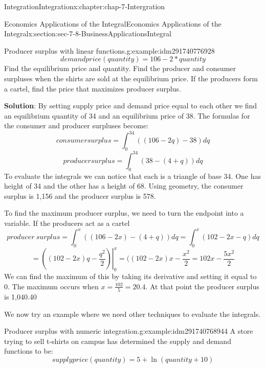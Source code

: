 \documentclass[oneside,10pt,]{book}
\newcommand{\terminology}[1]{\textbf{#1}}
\numberwithin{equation}{section}
\begin{document}
\begin{chapterptx}{Integration}{}{Integration}{}{}{x:chapter:chap-7-Intergration}
\begin{sectionptx}{Economics Applications of the Integral}{}{Economics Applications of the Integral}{}{}{x:section:sec-7-8-BusinessApplicationsIntegral}
\begin{example}{Producer surplus with linear functions.}{g:example:idm291740776928}
\begin{equation*}
\end{equation*}
%
\begin{equation*}
demand price(quantity)=106- 2*quantity
\end{equation*}
Find the equilibrium price and quantity.  Find the producer and consumer surpluses when the shirts are sold at the equilibrium price.  If the producers form a cartel, find the price that maximizes producer surplus.%
\par
\terminology{Solution}: By setting supply price and demand price equal to each other we find an equilibrium quantity of 34 and an equilibrium price of 38.  The formulas for the consumer and producer surpluses become:%
%
\begin{equation*}
consumer surplus= \int_0^{34} ((106-2q)-38)  dq
\end{equation*}
%
\begin{equation*}
producer surplus= \int_0^{34} ( 38-(4+q))  dq
\end{equation*}
To evaluate the integrals we can notice that each is a triangle of base 34.  One has height of 34 and the other has a height of 68.  Using geometry, the consumer surplus is \textdollar{}1,156 and the producer surplus is \textdollar{}578.%
\par
To find the maximum producer surplus, we need to turn the endpoint into a variable.  If the producers act as a cartel%
%
\begin{equation*}
producer\ surplus= \int_0^x ( (106-2x)-(4+q))  dq=\int_0^x ( 102-2x-q)  dq
\end{equation*}
%
\begin{equation*}
=\left.\left((102-2x)q-\frac{q^2}{2}\right) \right|_0^x=((102-2x)x-\frac{x^2}{2}=102x-\frac{5x^2}{2}
\end{equation*}
We can find the maximum of this by taking its derivative and setting it equal to 0.  The maximum occurs when \(x=\frac{102}{5}=20.4\).  At that point the producer surplus is \textdollar{}1,040.40%
\end{example}
We now try an example where we need other techniques to evaluate the integrals.%
\begin{example}{Producer surplus with numeric integration.}{g:example:idm291740768944}%
A store trying to sell t-shirts on campus has determined the supply and demand functions to be:%
%
\begin{equation*}
supply price(quantity)=5+\ln (quantity+10)
\end{equation*}
%
\begin{equation*}

\end{equation*}
\end{example}
\end{sectionptx}
\end{chapterptx}
\end{document}
